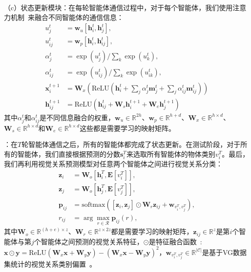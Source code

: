 （c）状态更新模块：在每轮智能体通信过程中，对于每个智能体，我们使用注意力机制~\cite{chen2017sca}来融合不同智能体的通信信息：
\begin{equation}
\begin{aligned}
    u^t_j &= \bm{w}_u [\bm{h}^t_i, \bm{h}^t_j], \\ 
    u^t_{ij} &= \bm{w}_p [\bm{h}^t_i, \bm{h}^t_{ij}], \\
    \alpha^t_j & = \exp(u^t_j) / \textstyle{\sum_k} \exp(u^t_k), \\
    \alpha^t_{ij} & = \exp(u^t_{ij}) / \textstyle{\sum_k} \exp(u^t_{ik}), \\
    \bm{x}^{t+1}_i &= \bm{W}_x (\text{ReLU} (\bm{h}^t_i + \textstyle{\sum_j} \alpha^t_j \bm{m}^t_j +  \textstyle{\sum_j} \alpha^t_{ij} \bm{m}^t_{ij})) \\
    \bm{h}^{t+1}_{ij} &= \text{ReLU} (\bm{h}^t_{ij} + \bm{W}_s \bm{h}^{t+1}_i + \bm{W}_e \bm{h}^{t+1}_j)
\end{aligned}
\end{equation}
其中$\alpha^t_j$和$\alpha^t_{ij}$是不同信息融合的权重，$\bm{w}_u \in \mathbb{R}^{2h}$、$\bm{w}_p \in \mathbb{R}^{h+d}$、$\bm{W}_x \in \mathbb{R}^{h\times d}$、$\bm{W}_s \in \mathbb{R}^{h\times d}$和$\bm{W}_e \in \mathbb{R}^{h\times d}$这些都是需要学习的映射矩阵。


\textbf{}：在$T$轮智能体通信之后，所有的智能体都完成了状态更新。在测试阶段，对于所有的智能体，我们直接根据预测的分数$\bm{s}^T_i$来选取所有智能体的物体类别$v^T_i$。最后，我们再利用视觉关系预测模型对任意两个智能体之间进行视觉关系分类：
\begin{equation}
\begin{aligned}
    \bm{z}_i & = \bm{W}_o [\bm{h}^T_i, \mathbf{E}[v^T_i]], \\
    \bm{z}_j & = \bm{W}_o [\bm{h}^T_j, \mathbf{E}[v^T_j]], \\
    \bm{p}_{ij} & = \text{softmax} ([\bm{z}_i,  \bm{z}_j] \odot \bm{W}_r \bm{z}_{ij} + \bm{w}_{v^T_i, v^T_j}), \\
    r_{ij} & = \arg \textstyle{\max_{r \in \mathcal{R}}} \bm{p}_{ij}(r),
\end{aligned}
\end{equation}
其中$\bm{W}_o \in \mathbb{R}^{(h+e) \times z}$、$\bm{W}_r \in \mathbb{R}^{z\times 2z}$都是需要学习的映射矩阵，$\bm{z}_{ij} \in \mathbb{R}^z$是第$i$个智能体与第$j$个智能体之间预测的视觉关系特征，$\odot$是特征融合函数~\cite{zhang2018learning}: $\bm{x} \odot \bm{y} = \text{ReLU}(\bm{W}_x \bm{x} + \bm{W}_y \bm{y}) - (\bm{W}_x \bm{x} - \bm{W}_y \bm{y})^2$，$\bm{w}_{v^T_i, v^T_j} \in \mathbb{R}^{|\mathcal{C}|}$是基于VG数据集统计的视觉关系类别偏置~\cite{zellers2018neural}。 



